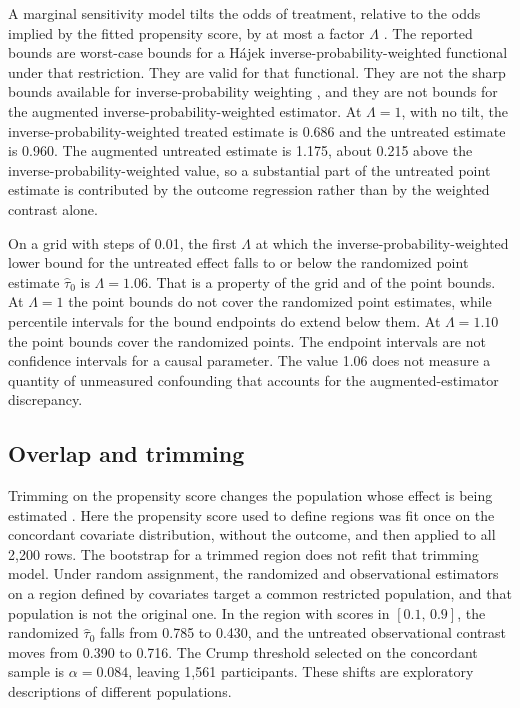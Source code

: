 \documentclass[11pt]{article}
\theoremstyle{remark}
\begin{document}
A marginal sensitivity model tilts the odds of treatment, relative to the odds implied by the fitted propensity score, by at most a factor $\Lambda$ \citep{tan2006,zhao2019}. The reported bounds are worst-case bounds for a H{\'a}jek inverse-probability-weighted functional under that restriction. They are valid for that functional. They are not the sharp bounds available for inverse-probability weighting \citep{dorn2023}, and they are not bounds for the augmented inverse-probability-weighted estimator. At $\Lambda=1$, with no tilt, the inverse-probability-weighted treated estimate is 0.686 and the untreated estimate is 0.960. The augmented untreated estimate is 1.175, about 0.215 above the inverse-probability-weighted value, so a substantial part of the untreated point estimate is contributed by the outcome regression rather than by the weighted contrast alone.

On a grid with steps of 0.01, the first $\Lambda$ at which the inverse-probability-weighted lower bound for the untreated effect falls to or below the randomized point estimate $\widehat\tau_0$ is $\Lambda=1.06$. That is a property of the grid and of the point bounds. At $\Lambda=1$ the point bounds do not cover the randomized point estimates, while percentile intervals for the bound endpoints do extend below them. At $\Lambda=1.10$ the point bounds cover the randomized points. The endpoint intervals are not confidence intervals for a causal parameter. The value 1.06 does not measure a quantity of unmeasured confounding that accounts for the augmented-estimator discrepancy.

\subsection{Overlap and trimming}

Trimming on the propensity score changes the population whose effect is being estimated \citep{crump2009}. Here the propensity score used to define regions was fit once on the concordant covariate distribution, without the outcome, and then applied to all 2{,}200 rows. The bootstrap for a trimmed region does not refit that trimming model. Under random assignment, the randomized and observational estimators on a region defined by covariates target a common restricted population, and that population is not the original one. In the region with scores in $[0.1,\,0.9]$, the randomized $\widehat\tau_0$ falls from 0.785 to 0.430, and the untreated observational contrast moves from 0.390 to 0.716. The Crump threshold selected on the concordant sample is $\alpha=0.084$, leaving 1{,}561 participants. These shifts are exploratory descriptions of different populations.
\end{document}
